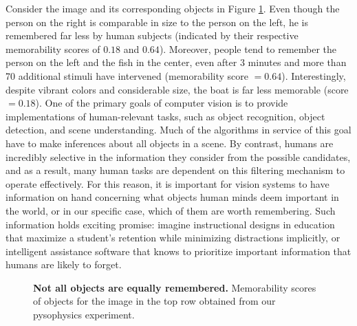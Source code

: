 

Consider the image and its corresponding objects in Figure
\ref{fig:introPhoto}. Even though the person on the right is
comparable in size to the person on the left, he is remembered far
less by human subjects (indicated by their respective memorability
scores of $0.18$ and $0.64$). Moreover, people tend to remember the
person on the left and the fish in the center, even after $3$ minutes
and more than 70 additional stimuli have intervened (memorability
score $= 0.64$). Interestingly, despite vibrant colors and
considerable size, the boat is far less memorable (score $=
0.18$). One of the primary goals of computer vision is to provide
implementations of human-relevant tasks, such as object recognition,
object detection, and scene understanding. Much of the algorithms in
service of this goal have to make inferences about all objects in a
scene. By contrast, humans are incredibly selective in the information
they consider from the possible candidates, and as a result, many
human tasks are dependent on this filtering mechanism to operate
effectively. For this reason, it is important for vision systems to
have information on hand concerning what objects human minds deem
important in the world, or in our specific case, which of them are
worth remembering. Such information holds exciting promise: imagine
instructional designs in education that maximize a student's retention
while minimizing distractions implicitly, or intelligent assistance
software that knows to prioritize important information that humans
are likely to forget. 

\begin{figure}[t]
\centering
{}
\vspace{-5mm}\caption{\footnotesize\textbf{Not all objects are equally remembered.} Memorability scores of objects for the image in the top row obtained from our pysophysics experiment. }\label{fig:introPhoto}
\end{figure}


